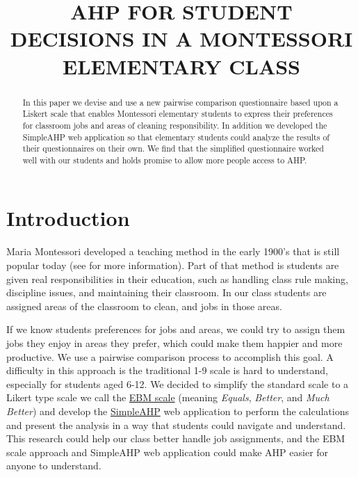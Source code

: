\documentclass[11pt]{article}
\title{AHP FOR STUDENT DECISIONS IN A MONTESSORI ELEMENTARY CLASS}
\renewcommand{\maketitle}{\begin{center}{\Large \textbf{\thetitle}} \end{center}}
\begin{document}
\maketitle
\thispagestyle{fancy}

\begin{abstract}
In this paper we devise and use a new pairwise comparison questionnaire based upon a
Liskert scale that enables
Montessori elementary students to express their preferences for classroom jobs and
areas of cleaning responsibility.  In addition we developed the SimpleAHP web application
so that elementary students could analyze the results of their questionnaires on their
own.  We find that the simplified questionnaire worked well with our students and holds
promise to allow more people access to AHP.


\end{abstract}


\section{Introduction}
Maria Montessori developed a teaching method in the early 1900's that is still popular today (see \citep{montessori2013montessori} for more information).  Part of that method is students are given real responsibilities in their education, such as handling class rule making, discipline issues, and  maintaining their classroom. In our class students are assigned areas of the classroom to clean, and jobs in those areas.

If we know students preferences for jobs and areas, we could
try to assign them jobs they enjoy in areas they prefer, which could
make them happier and more productive.  We use a pairwise comparison
process to accomplish this goal.  A difficulty in this approach is
the traditional 1-9 scale is hard to understand, especially for students
aged 6-12.  We decided to simplify the standard scale to a Likert type
scale we call the \ul{EBM scale} (meaning \emph{Equals}, 
\emph{Better}, and \emph{Much Better}) and develop the \ul{SimpleAHP}
web application to perform the calculations and present the analysis in a
way that students could navigate and understand.  This research could help our class
better handle job assignments, and the EBM scale approach and SimpleAHP web
application could make AHP
easier for anyone to understand.
\end{document}
